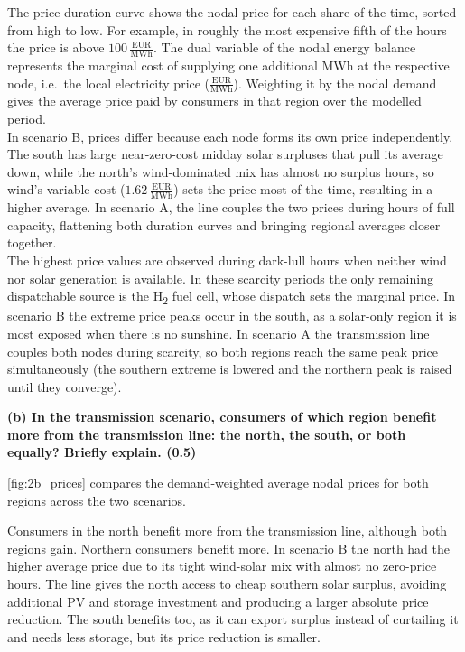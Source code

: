 The price duration curve shows the nodal price for each share of the time, sorted from high to low.
For example, in roughly the most expensive fifth of the hours the price is above $100\,\frac{\text{EUR}}{\text{MWh}}$. 
The dual variable of the nodal energy balance represents the marginal cost of supplying one additional MWh at the respective node, i.e.\ the local electricity price ($\frac{\text{EUR}}{\text{MWh}}$).
Weighting it by the nodal demand gives the average price paid by consumers in that region over the modelled period. \\
In scenario B, prices differ because each node forms its own price independently. The south has large near-zero-cost midday solar surpluses that pull its average down, while the north's wind-dominated mix has almost no surplus hours, so wind's variable cost ($1.62\,\frac{\text{EUR}}{\text{MWh}}$) sets the price most of the time, resulting in a higher average. In scenario A, the line couples the two prices during hours of full capacity, flattening both duration curves and bringing regional averages closer together. \\
The highest price values are observed during dark-lull hours when neither wind nor solar generation is available.
In these scarcity periods the only remaining dispatchable source is the H\textsubscript{2} fuel cell, whose dispatch sets the marginal price. In scenario B the extreme price peaks occur in the south, as a solar-only region it is most exposed when there is no sunshine.
In scenario A the transmission line couples both nodes during scarcity, so both regions reach the same peak price simultaneously (the southern extreme is lowered and the northern peak is raised until they converge).

\textbf{
    (b) In the transmission scenario, consumers of which region benefit more from the transmission line: the north, the south, or both equally? Briefly explain. (0.5)
    }

\autoref{fig:2b_prices} compares the demand-weighted average nodal prices for both regions across the two scenarios.



Consumers in the north benefit more from the transmission line, although both regions gain.
Northern consumers benefit more. In scenario B the north had the higher average price due to its tight wind-solar mix with almost no zero-price hours. The line gives the north access to cheap southern solar surplus, avoiding additional PV and storage investment and producing a larger absolute price reduction. The south benefits too, as it can export surplus instead of curtailing it and needs less storage, but its price reduction is smaller.

